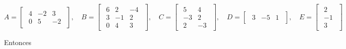 \documentclass{article}
\begin{document}
\begin{equation*}
    A = \begin{bmatrix}
        \begin{array}{rrr}
            4 & -2 & 3\\ 
            0 & 5 & -2
        \end{array}
    \end{bmatrix}
    , \quad B = \begin{bmatrix}
        \begin{array}{rrr}
            6 & 2 & -4\\ 
            3 & -1 & 2\\
            0 & 4 & 3
        \end{array}
    \end{bmatrix}
    , \quad C = \begin{bmatrix}
        \begin{array}{rr}
            5 & 4\\ 
            -3 & 2\\
            2 & -3
        \end{array}
    \end{bmatrix}
    , \quad D = \begin{bmatrix}
        \begin{array}{rrr}
            3 & -5 & 1
        \end{array}
    \end{bmatrix}
    , \quad E = \begin{bmatrix}
        \begin{array}{r}
            2 \\ 
            -1\\
            3
        \end{array}
    \end{bmatrix}
\end{equation*}

Entonces 
\end{document}
